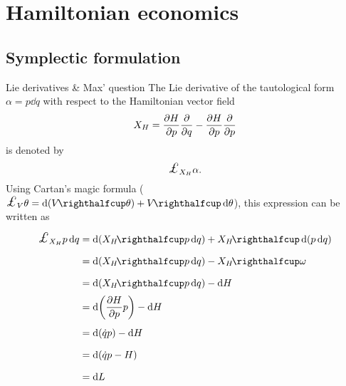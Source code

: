 \chapter{Hamiltonian economics}

\section{Symplectic formulation}

\begin{aside}{Lie derivatives \& Max' question}
    The Lie derivative of the tautological form $\alpha = p\dd{q}$ with respect to the
    Hamiltonian vector field
    $$ X_H = \pdv{H}{p}\pdv{}{q} - \pdv{H}{p}\pdv{}{p}$$
    is denoted by
    $$ \lied{X_H}{\alpha}.$$
    Using Cartan's magic formula ($ \lied{V}{\theta} = \dd{(\intpr{V}{\theta})} + \intpr{V}{\dd{\theta}}$), this expression
    can be written as
    \begin{equation*} 
        \begin{split}
            \lied{X_H}{p\dd{q}} &= \dd{(\intpr{X_H}{p\dd{q}})} + \intpr{X_H}{\dd{(p\dd{q})}} \\
                                &= \dd{(\intpr{X_H}{p\dd{q}})} - \intpr{X_H}{\omega} \\
                                &= \dd{(\intpr{X_H}{p\dd{q}})} - \dd{H} \\
                                &= \dd{\qty(\pdv{H}{p}p)} - \dd{H} \\
                                &= \dd{(\dot{q}p)} - \dd{H} \\
                                &= \dd{(\dot{q}p - H)} \\
                                &= \dd{L} \\
        \end{split}
    \end{equation*}


\end{aside}
